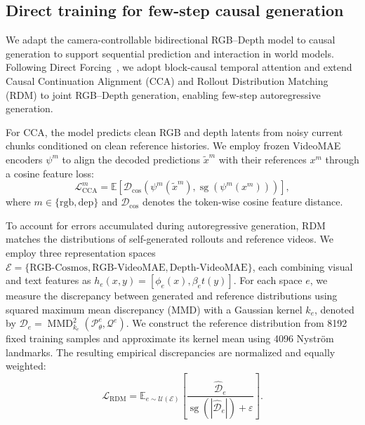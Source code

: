 \subsection{Direct training for few-step causal generation}
\label{sec:causal_adaptation}

We adapt the camera-controllable bidirectional RGB--Depth model to causal generation to support sequential prediction and interaction in world models.
%
Following Direct Forcing~\cite{xu2026directforcingsinglestagetraining}, we adopt block-causal temporal attention and extend Causal Continuation Alignment (CCA) and Rollout Distribution Matching (RDM) to joint RGB--Depth generation, enabling few-step autoregressive generation.

For CCA, the model predicts clean RGB and depth latents from noisy current chunks conditioned on clean reference histories.
%
We employ frozen VideoMAE encoders $\psi^m$ to align the decoded predictions $\widetilde{x}^m$ with their references $x^m$ through a cosine feature loss:
\begin{equation}
\mathcal{L}_{\mathrm{CCA}}^m
=\mathbb{E}\left[
\mathcal{D}_{\mathrm{cos}}\left(
\psi^m(\widetilde{x}^m),
\operatorname{sg}(\psi^m(x^m))
\right)\right],
\label{eq:causal_cca}
\end{equation}
where $m\in\{\mathrm{rgb},\mathrm{dep}\}$ and $\mathcal{D}_{\mathrm{cos}}$ denotes the token-wise cosine feature distance.

To account for errors accumulated during autoregressive generation, RDM matches the distributions of self-generated rollouts and reference videos.
%
We employ three representation spaces $\mathcal{E}=\{\mathrm{RGB\text{-}Cosmos},\mathrm{RGB\text{-}VideoMAE},\mathrm{Depth\text{-}VideoMAE}\}$, each combining visual and text features as $h_e(x,y)=[\phi_e(x),\beta_e t(y)]$.
%
For each space $e$, we measure the discrepancy between generated and reference distributions using squared maximum mean discrepancy (MMD) with a Gaussian kernel $k_e$, denoted by $\mathcal{D}_e=\operatorname{MMD}_{k_e}^2(\mathcal{P}_\theta^e,\mathcal{Q}^e)$.
%
We construct the reference distribution from 8192 fixed training samples and approximate its kernel mean using 4096 Nystr\"om landmarks.
%
The resulting empirical discrepancies are normalized and equally weighted:
\begin{equation}
\mathcal{L}_{\mathrm{RDM}}
=\mathbb{E}_{e\sim\mathcal{U}(\mathcal{E})}
\left[
\frac{\widehat{\mathcal{D}}_e}
{\operatorname{sg}(|\widehat{\mathcal{D}}_e|)+\varepsilon}
\right].
\label{eq:causal_rdm}
\end{equation}


